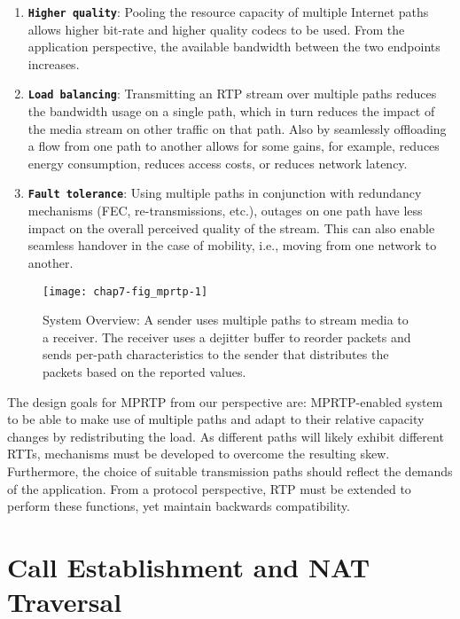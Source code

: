 \begin{enumerate}
\setlength{\itemsep}{5pt}

\item \textbf{\texttt{Higher quality}}: Pooling the resource capacity of
multiple Internet paths allows higher bit-rate and higher quality codecs to be
used. From the application perspective, the available bandwidth between the
two endpoints increases.

\item \textbf{\texttt{Load balancing}}: Transmitting an RTP stream over
multiple paths reduces the bandwidth usage on a single path, which in turn
reduces the impact of the media stream on other traffic on that path. Also by
seamlessly offloading a flow from one path to another allows for some gains,
for example, reduces energy consumption, reduces access costs, or reduces
network latency.

\item \textbf{\texttt{Fault tolerance}}: Using multiple paths in conjunction
with redundancy mechanisms (FEC, re-transmissions, etc.), outages on one path
have less impact on the overall perceived quality of the stream. This can also
enable seamless handover in the case of mobility, i.e., moving from one
network to another.

\end{enumerate}


\begin{figure}
\centerline {
\texttt{[image: chap7-fig\_mprtp-1]}
}
\caption{System Overview: A sender uses multiple paths to stream media
  to a receiver.  The receiver uses a dejitter buffer to reorder
  packets and sends per-path characteristics to the sender that
  distributes the packets based on the reported values.}
\label{chap7:fig_mprtp}
\end{figure}

The design goals for MPRTP from our perspective are: MPRTP-enabled system to
be able to make use of multiple paths and adapt to their relative capacity
changes by redistributing the load. As different paths will likely exhibit
different RTTs, mechanisms must be developed to overcome the resulting skew.
Furthermore, the choice of suitable transmission paths should reflect the
demands of the application. From a protocol perspective, RTP must be extended
to perform these functions, yet maintain backwards compatibility.

\section{Call Establishment and NAT Traversal}

